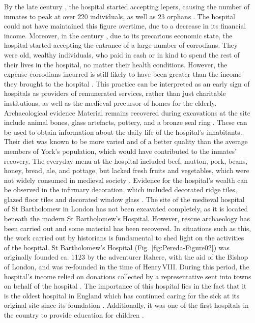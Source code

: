 \documentclass[%
	]{ijsra}
\begin{document}
By the late  century \AD, the hospital started accepting lepers, causing the number of inmates to peak at over \num{220} individuals, as well as 23 orphans \parencites[6,10]{Cullum_1991}[151]{Palliser_2014}. The hospital could not have maintained this figure overtime, due to a decrease in its financial income. 
Moreover, in the  century \AD, due to its precarious economic state, the hospital started accepting the entrance of a large number of corrodians. They were old, wealthy individuals, who paid in cash or in kind to spend the rest of their lives in the hospital, no matter their health conditions. 
However, the expense corrodians incurred is still likely to have been greater than the income they brought to the hospital \parencites[235]{Brodman_2009}[6]{Cullum_1991}. This practice can be interpreted as an early sign of hospitals as providers of remunerated services, rather than just charitable institutions, as well as the medieval precursor of homes for the elderly.
Archaeological evidence
Material remains recovered during excavations at the site include animal bones, glass artefacts, pottery, and a bronze seal ring \parencite{Johnson_2014}. These can be used to obtain information about the daily life of the hospital’s inhabitants. Their diet was known to be more varied and of a better quality than the average members of York’s population, which would have contributed to the inmates’ recovery. 
The everyday menu at the hospital included beef, mutton, pork, beans, honey, bread, ale, and pottage, but lacked fresh fruits and vegetables, which were not widely consumed in medieval society \parencites[16-17]{Cullum_1991}[19]{Cullum_1999}. 
Evidence for the hospital’s wealth can be observed in the infirmary decoration, which included decorated ridge tiles, glazed floor tiles and decorated window glass \parencite[101]{Dean_2008}. 
\IJSRAseparator
The site of the medieval hospital of St Bartholomew in London has not been excavated completely, as it is located beneath the modern St Bartholomew’s Hospital. However, rescue archaeology has been carried out and some material has been recovered.
In situations such as this, the work carried out by historians is fundamental to shed light on the activities of the hospital. St Bartholomew’s Hospital (Fig. \ref{fig:Pereda-Figure02}) %
was originally founded ca. 1123 by the adventurer Rahere, with the aid of the Bishop of London, and was re-founded in the time of Henry\,VIII. During this period, the hospital’s income relied on donations collected by a representative sent into towns on behalf of the hospital \parencite[19,42]{Dainton_1961}. 
The importance of this hospital lies in the fact that it is the oldest hospital in England which has continued caring for the sick at its original site since its foundation \parencite[35]{Dainton_1961}. 
Additionally, it was one of the first hospitals in the country to provide education for children \parencite[21]{Rawcliffe_1999}. 
\end{document}
